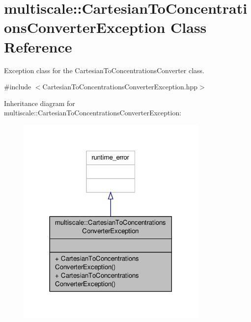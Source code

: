 \hypertarget{classmultiscale_1_1CartesianToConcentrationsConverterException}{\section{multiscale\-:\-:Cartesian\-To\-Concentrations\-Converter\-Exception Class Reference}
\label{classmultiscale_1_1CartesianToConcentrationsConverterException}
}


Exception class for the Cartesian\-To\-Concentrations\-Converter class.  




{\ttfamily \#include $<$Cartesian\-To\-Concentrations\-Converter\-Exception.\-hpp$>$}



Inheritance diagram for multiscale\-:\-:Cartesian\-To\-Concentrations\-Converter\-Exception\-:\nopagebreak
\begin{figure}[H]
\begin{center}
\leavevmode
\includegraphics[width=266pt]{classmultiscale_1_1CartesianToConcentrationsConverterException__inherit__graph}
\end{center}
\end{figure}


